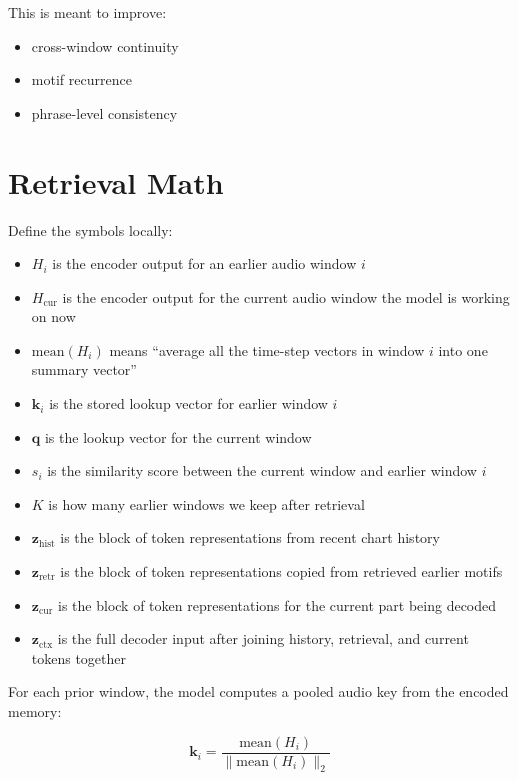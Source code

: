 \documentclass[11pt]{article}
\begin{document}
This is meant to improve:

\begin{itemize}[leftmargin=1.5em]
    \item cross-window continuity
    \item motif recurrence
    \item phrase-level consistency
\end{itemize}

\section*{Retrieval Math}

Define the symbols locally:

\begin{itemize}[leftmargin=1.5em]
    \item $H_i$ is the encoder output for an earlier audio window $i$
    \item $H_{\mathrm{cur}}$ is the encoder output for the current audio window the model is working on now
    \item $\mathrm{mean}(H_i)$ means ``average all the time-step vectors in window $i$ into one summary vector''
    \item $\mathbf{k}_i$ is the stored lookup vector for earlier window $i$
    \item $\mathbf{q}$ is the lookup vector for the current window
    \item $s_i$ is the similarity score between the current window and earlier window $i$
    \item $K$ is how many earlier windows we keep after retrieval
    \item $\mathbf{z}_{\mathrm{hist}}$ is the block of token representations from recent chart history
    \item $\mathbf{z}_{\mathrm{retr}}$ is the block of token representations copied from retrieved earlier motifs
    \item $\mathbf{z}_{\mathrm{cur}}$ is the block of token representations for the current part being decoded
    \item $\mathbf{z}_{\mathrm{ctx}}$ is the full decoder input after joining history, retrieval, and current tokens together
\end{itemize}

For each prior window, the model computes a pooled audio key from the encoded memory:

\[
\mathbf{k}_i = \frac{\mathrm{mean}(H_i)}{\lVert \mathrm{mean}(H_i) \rVert_2}
\]
\end{document}
